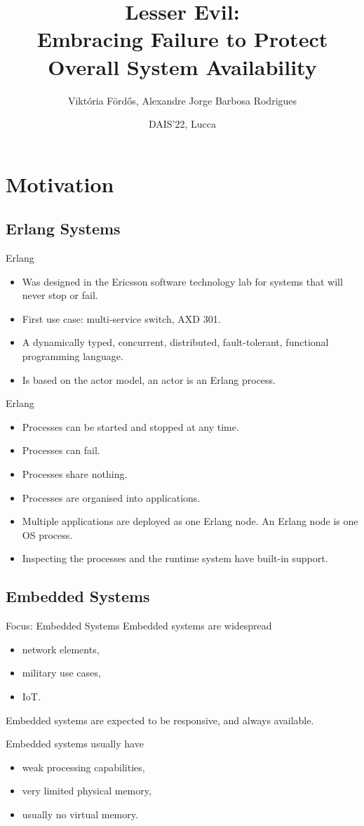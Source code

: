 \documentclass{beamer}
\title[ Lesser Evil]
{{\small Lesser Evil: \\ Embracing Failure to Protect Overall System Availability}
}
\author[Viktória Fördős, Alexandre Jorge Barbosa Rodrigues]
       {{\large
		Viktória Fördős, Alexandre Jorge Barbosa Rodrigues
       }}
\institute{
Cisco, Sweden
}
\date{{\scriptsize DAIS'22, Lucca}}
\begin{document}
\begin{frame}
  \titlepage
\end{frame}


\section{Motivation}
\subsection{Erlang Systems}
\begin{frame}{Erlang}
\begin{itemize}
\item Was designed in the Ericsson software technology lab for systems that will never stop or fail. 
\item First use case: multi-service switch, AXD 301.
\item A dynamically typed, concurrent, distributed, fault-tolerant, functional programming language. 
\item Is based on the actor model, an actor is an Erlang process.
\end{itemize}
\end{frame}

\begin{frame}{Erlang}
\begin{itemize}
\item Processes  can be started and stopped at any time.
\item Processes can fail.
\item Processes share nothing.
\item Processes are organised into applications. 
\item Multiple applications are deployed as one Erlang node. An Erlang node is one OS process.
\item Inspecting the processes and the runtime system have built-in support.
\end{itemize}
\end{frame}

\subsection{Embedded Systems}
\begin{frame}{Focus: Embedded Systems}
Embedded systems are widespread
\begin{itemize}
\item network elements,
\item military use cases,
\item IoT.
\end{itemize}

Embedded systems are expected to be responsive, and always available.

Embedded systems usually have
\begin{itemize}
\item weak processing capabilities,
\item very limited physical memory,
\item usually no virtual memory.
\end{itemize}

\end{frame}
\end{document}
